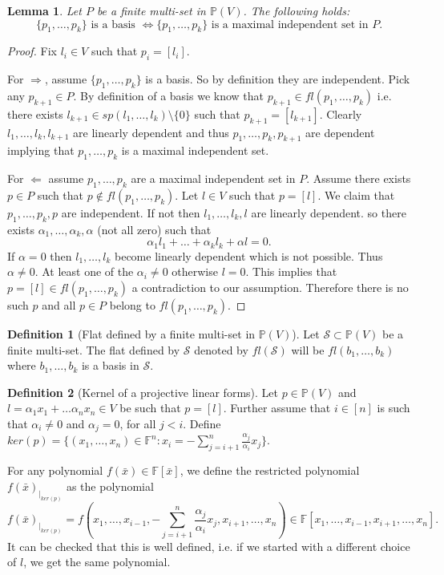 \documentclass[12pt]{caltech_thesis}
\theoremstyle{plain}
\newtheorem{lemma}{Lemma}
\theoremstyle{definition}
\newtheorem{definition}{Definition}
\newcommand{\F}{\mathbb{F}}
\newcommand{\MS}{\mathcal{S}}
\newcommand{\PP}{\mathbb{P}}
\newcommand{\B}[1]{\bar{#1}}
\begin{document}
\begin{lemma}\label{lemma:basisasdimension}
 Let $P$ be a finite multi-set in $\PP(V)$. The following holds:
 \[
  \{p_1,\ldots,p_k\} \text{ is a basis }\Leftrightarrow \{ p_1,\ldots, p_k\} \text{ is a maximal independent set in }P. 
 \]

\end{lemma}

\begin{proof}
 Fix $l_i\in V$ such that $p_i = [l_i]$.  
 
 For $\Rightarrow$, assume $\{p_1,\ldots,p_k\}$ is a basis. So by definition they are independent.
 Pick any $p_{k+1}\in P$. By definition of a basis we know that $p_{k+1}\in fl(p_1,\ldots,p_k)$ i.e. there exists
 $l_{k+1}\in sp(l_1,\ldots,l_k)\setminus \{0\}$ such that $p_{k+1} = [l_{k+1}]$. Clearly $l_1,\ldots,l_k,l_{k+1}$ are linearly dependent
 and thus $p_1,\ldots,p_k,p_{k+1}$ are dependent implying that $p_1,\ldots,p_k$ is a maximal independent set.
 
 For $\Leftarrow$ assume $p_1,\ldots,p_k$ are a maximal independent set in $P$. Assume there exists $p\in P$ such that 
 $p\notin fl(p_1,\ldots,p_k)$. Let $l\in V$ such that $p=[l]$. We claim that $p_1,\ldots,p_k,p$ are independent. If not then 
 $l_1,\ldots,l_k,l$ are linearly dependent. so there exists $\alpha_1,\ldots,\alpha_k,\alpha$ (not all zero) such that
 \[
  \alpha_1l_1+\ldots +\alpha_kl_k +\alpha l =0.
 \]
If $\alpha=0$ then $l_1,\ldots,l_k$ become linearly dependent which is not possible. Thus $\alpha\neq 0$. At least one of the 
$\alpha_i \neq 0$ otherwise $l=0$. This implies that $p=[l] \in fl(p_1,\ldots,p_k)$ a contradiction to our assumption. Therefore there is 
no such $p$ and all $p\in P$ belong to $fl(p_1,\ldots,p_k)$.

\end{proof}

\begin{definition}[Flat defined by a finite multi-set in $\PP(V)$]
Let $\MS\subset \PP(V)$ be a finite multi-set. The flat defined by $\MS$ denoted by $fl(\MS)$ will be $fl(b_1,\ldots,b_k)$
where $b_1,\ldots,b_k$ is a basis in $\MS$.
\end{definition}


\begin{definition}[Kernel of a projective linear forms]\label{defn:kernel}
 Let $p\in \PP(V)$ and $l = \alpha_1x_1+\ldots \alpha_nx_n\in V$ be such that $p=[l]$. 
 Further assume that $i\in [n]$ is such that $\alpha_i\neq 0$ and $\alpha_j = 0$, for all $j<i$. 
 Define $ker(p) = \{(x_1,\ldots,x_n)\in \F^n : x_i = -\sum\limits_{j=i+1}^n\frac{\alpha_j}{\alpha_i}x_j\}$.
 
 For any polynomial $f(\B{x}) \in \F[\B{x}]$, we define the restricted polynomial $f(\B{x})_{|_{ker(p)}}$ as the polynomial
 \[
  f(\B{x})_{|_{ker(p)}} = f(x_1,\ldots,x_{i-1}, -\sum\limits_{j=i+1}^n\frac{\alpha_j}{\alpha_i}x_j , x_{i+1},\ldots,x_n ) \in \F[x_1,\ldots,x_{i-1},
  x_{i+1},\ldots,x_n].
 \]
It can be checked that this is well defined, i.e. if we started with a different choice of $l$, we get the
same polynomial.
\end{definition}
\end{document}
